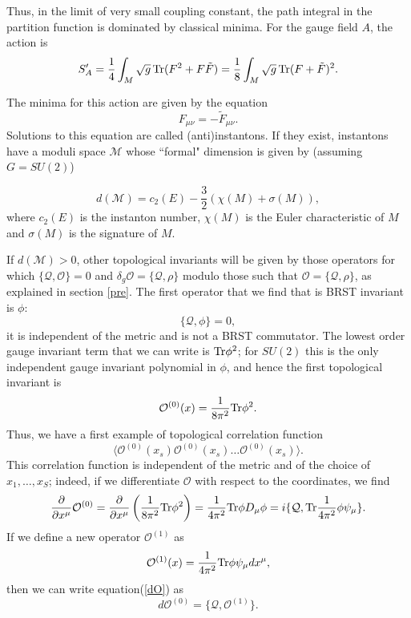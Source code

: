 \documentclass[12pt, onecolumn]{article}
\begin{document}
Thus, in the limit of very small coupling constant, the path integral in the partition function is dominated by classical minima. For the gauge field $A$, the action is 
\begin{equation}
S'_A=\frac{1}{4}\int_M \sqrt{g}\,{\rm Tr}(F^2+F\tilde{F}) =\frac{1}{8}\int_M \sqrt{g}\,{\rm Tr}(F+\tilde{F})^2.
\end{equation} 

The minima for this action are given by the equation
\begin{equation}
F_{\mu \nu}= - \tilde{F}_{\mu \nu}.
\end{equation} Solutions to this equation are called (anti)instantons.  If they exist, instantons have a moduli space $\mathcal{M}$ whose ``formal" dimension is given by (assuming $G=SU(2)$)

\begin{equation} 
d(\mathcal{M})=c_2(E)-\frac{3}{2}(\chi(M)+\sigma(M)),
\end{equation} where $c_2(E)$ is the instanton number, $\chi(M)$ is the Euler characteristic of $M$ and $\sigma(M)$ is the signature of $M$. 

If $d(\mathcal{M})>0$, other topological invariants will be given by those operators for which $\{\mathcal{Q}, \mathcal{O}\}=0$ and $\delta_g \mathcal{O}=\{\mathcal{Q},\rho\}$  modulo those such that $\mathcal{O}=\{\mathcal{Q},\rho\}$, as explained in section \ref{pre}. The first operator that we find that is BRST invariant is $\phi$: $$\{\mathcal{Q}, \phi\}=0,$$ it is independent of the metric and is not a BRST commutator. The lowest order gauge invariant term that we can write is ${\rm Tr} \phi^2$; for $SU(2)$ this is the only independent gauge invariant polynomial in $\phi$, and hence the first topological invariant is 
\begin{equation} 
\mathcal{O}^{(0)}(x)=\frac{1}{8\pi^2}{\rm Tr} \phi^2. \label{O-0}
\end{equation}
Thus, we have a first example of topological correlation function
\begin{equation}
\langle \mathcal{O}^{(0)}(x_s)\mathcal{O}^{(0)}(x_s)\ldots\mathcal{O}^{(0)}(x_s)\rangle.
\end{equation}
This correlation function is independent of the metric and of the choice of $x_1, \ldots, x_S$; indeed, if we differentiate $\mathcal{O}$ with respect to the coordinates, we find 
\begin{equation}
\frac{\partial}{\partial x^\mu}\mathcal{O}^{(0)} =\frac{\partial}{\partial x^\mu}\left(\frac{1}{8\pi^2}{\rm Tr} \phi^2\right)=\frac{1}{4\pi^2}{\rm Tr}\phi D_\mu \phi = i\{\mathcal{Q},{\rm Tr}\frac{1}{4\pi^2}\phi \psi_\mu\}.\label{dO}
\end{equation}
If  we define a new operator $\mathcal{O}^{(1)}$ as 
\begin{equation} 
\mathcal{O}^{(1)}(x)=\frac{1}{4\pi^2}{\rm Tr} \phi\psi_\mu dx^\mu, \label{O-1}
\end{equation} then we can write equation(\ref{dO}) as 
\begin{equation}
d\mathcal{O}^{(0)}=\{\mathcal{Q},\mathcal{O}^{(1)}\}. 
\end{equation} 
\end{document}

